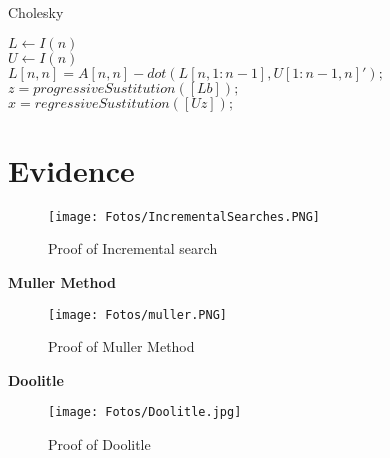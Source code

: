 \documentclass[letterpaper,12pt]{article}
\begin{document}
\IncMargin{1em}
\begin{algorithm}   
\caption{Cholesky}

$L \leftarrow I(n) $\\
$U \leftarrow I(n) $\\

$L[n,n] = A[n,n]-dot(L[n,1:n-1],U[1:n-1,n]');$\\
$z=progressiveSustitution([L  b]);$\\
$x=regressiveSustitution([U  z]); $
\end{algorithm}\DecMargin{1em}




\section{Evidence}


\begin{figure}[H]
  \texttt{[image: Fotos/IncrementalSearches.PNG]}
  \caption{Proof of Incremental search}
  \label{fig:cond}
\end{figure}
\textbf{\textbf{\textbf{}}}

\textbf{Muller Method}

\begin{figure}[H]
  \texttt{[image: Fotos/muller.PNG]}
  \caption{Proof of Muller Method}
  \label{fig:cond}
\end{figure}
\textbf{\textbf{\textbf{}}}

\textbf{Doolitle}

\begin{figure}[H]
  \texttt{[image: Fotos/Doolitle.jpg]}
  \caption{Proof of Doolitle}
  \label{fig:cond}
\end{figure}
\textbf{\textbf{\textbf{}}}
\end{document}
